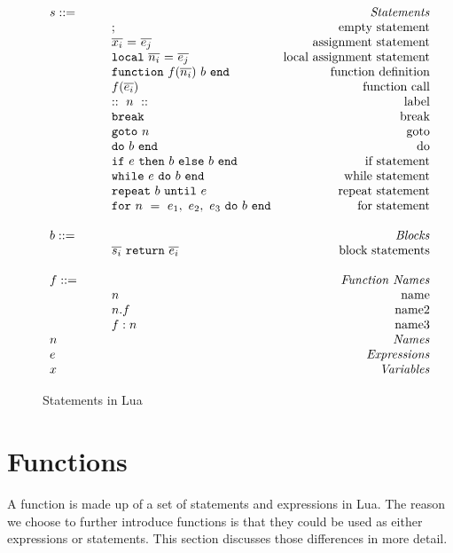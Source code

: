 \newcommand{\assign}[2]{{\overline{#1_i}}~{=}~{\overline{#2_j}}}
\newcommand{\doe}[1]{\mbox{\tt do}~#1~{\tt end}}
\newcommand{\ife}[3]{\mbox{\tt if}~{#1}~\mbox{\tt then}~{#2}~\mbox{\tt else}~{#3}~{\tt end}}
\newcommand{\whilee}[2]{\mbox{\tt while}~#1~{\tt do}~#2~{\tt end}}
\newcommand{\repeate}[2]{\mbox{\tt repeat}~#2~{\tt until}~#1~}
\newcommand{\for}[3]{\mbox{\tt for}~#1~=~#2_1,~#2_2,~#2_3~{\tt do}~#3~{\tt end}}
\newcommand{\function}[3]{\mbox{\tt function}~#1({\overline{#2_i}})~#3~{\tt end}}
\newcommand{\local}[2]{\mbox{\tt local}~{\assign #1 #2}}

\begin{figure}
\caption{Statements in Lua}
\label{fig:LuaStat}
\[
\begin{array}{llr}
  \mydefhead{s ::=\qquad\qquad\qquad\qquad}{Statements}
  \mydefcase{;}{empty statement}
  \mydefcase{\assign x e}{assignment statement}
  \mydefcase{\local n e}{local assignment statement}
  \mydefcase{\function f n b}{function definition}
  \mydefcase{f(\overline{e_i})}{function call}
  \mydefcase{::~n~::}{label}
  \mydefcase{\tt break}{break}
  \mydefcase{{\tt goto} ~n}{goto}
  \mydefcase{\doe b}{do}
  \mydefcase{\ife e b b}{if statement}
  \mydefcase{\whilee e b}{while statement}
  \mydefcase{\repeate e b}{repeat statement}
  \mydefcase{\for n e b}{for statement}
  \\
  \mydefhead{b ::=\qquad\qquad\qquad\qquad}{Blocks}
  \mydefcase{\overline{s_i}~{\tt return}~\overline{e_i}}{block statements}
  \\
  \mydefhead{f ::=\qquad\qquad\qquad\qquad}{Function Names}
  \mydefcase{n}{name}
  \mydefcase{n.f}{name2}
  \mydefcase{f:n}{name3}
  \mydefhead{n \qquad\qquad\qquad\qquad}{Names}
  \mydefhead{e \qquad\qquad\qquad\qquad}{Expressions}
  \mydefhead{x \qquad\qquad\qquad\qquad}{Variables}
\end{array}
\]
\end{figure}

\section{Functions}
A function is made up of a set of statements and expressions in Lua. The reason we choose to further introduce functions is that they could be used as either expressions or statements.
This section discusses those differences in more detail.

